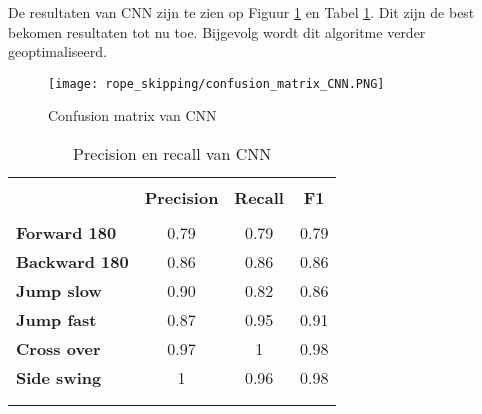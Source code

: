 De resultaten van CNN zijn te zien op Figuur \ref{fig:CNN} en Tabel \ref{tab:CNN}. Dit zijn de best bekomen resultaten tot nu toe. Bijgevolg wordt dit algoritme verder geoptimaliseerd.

\begin{figure}[!htpd]
\centering
\caption{Confusion matrix van CNN}\label{fig:CNN}
\texttt{[image: rope\_skipping/confusion\_matrix\_CNN.PNG]} 
\end{figure}

\begin{table}[!htpd]
  \centering
  \caption{Precision en recall van CNN}
  \label{tab:CNN}
\begin{tabular}{lccc}
 \hline \\
\textbf{}             & \textbf{Precision} & \textbf{Recall} & \textbf{F1} &  \\
\hline \\
\textbf{Forward 180}  & 0.79               & 0.79            & 0.79        &  \\
\textbf{Backward 180} & 0.86               & 0.86            & 0.86        &  \\
\textbf{Jump slow}    & 0.90               & 0.82            & 0.86        &  \\
\textbf{Jump fast}    & 0.87               & 0.95            & 0.91        &  \\
\textbf{Cross over}   & 0.97               & 1               & 0.98        &  \\
\textbf{Side swing}   & 1                  & 0.96            & 0.98        & \\\\
\hline \\
\end{tabular}
\end{table}

